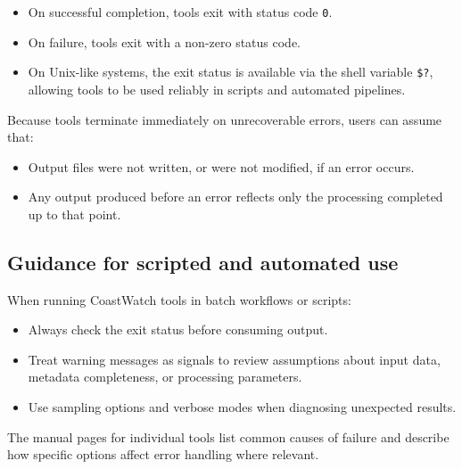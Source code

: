 \begin{itemize}
  \item On successful completion, tools exit with status code \texttt{0}.
  \item On failure, tools exit with a non-zero status code.
  \item On Unix-like systems, the exit status is available via the shell variable \texttt{\$?}, allowing tools to be used reliably in scripts and automated pipelines.
\end{itemize}

Because tools terminate immediately on unrecoverable errors, users can assume that:
\begin{itemize}
  \item Output files were not written, or were not modified, if an error occurs.
  \item Any output produced before an error reflects only the processing completed up to that point.
\end{itemize}

\subsection*{Guidance for scripted and automated use}

When running CoastWatch tools in batch workflows or scripts:
\begin{itemize}
  \item Always check the exit status before consuming output.
  \item Treat warning messages as signals to review assumptions about input data, metadata completeness, or processing parameters.
  \item Use sampling options and verbose modes when diagnosing unexpected results.
\end{itemize}

The manual pages for individual tools list common causes of failure and describe how specific options affect error handling where relevant.
